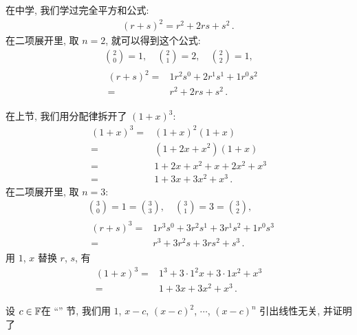 \begin{example}
    在中学, 我们学过完全平方和公式:
    \begin{align*}
        (r + s)^2 = r^2 + 2rs + s^2 \period
    \end{align*}
    在二项展开里, 取 $n = 2$, 就可以得到这个公式:
    \begin{align*}
         & \binom{2}{0} = 1, \quad \binom{2}{1} = 2, \quad \binom{2}{2} = 1, \\
         & \begin{aligned}
            (r + s)^2
            = {} & 1r^2 s^0 + 2r^1 s^1 + 1r^0 s^2 \\
            = {} & r^2 + 2rs + s^2 \period
        \end{aligned}
    \end{align*}

    在上节, 我们用分配律拆开了 $(1+x)^3$:
    \begin{align*}
        (1+x)^3
        = {} & (1+x)^2 (1+x)         \\
        = {} & (1+2x+x^2) (1+x)      \\
        = {} & 1+2x+x^2 + x+2x^2+x^3 \\
        = {} & 1+3x+3x^2+x^3 \period
    \end{align*}
    在二项展开里, 取 $n = 3$:
    \begin{align*}
         & \binom{3}{0} = 1 = \binom{3}{3}, \quad \binom{3}{1} = 3 = \binom{3}{2}, \\
         & \begin{aligned}
            (r+s)^3
            = {} & 1r^3 s^0 + 3r^2 s^1 + 3r^1 s^2 + 1r^0 s^3 \\
            = {} & r^3 + 3r^2 s + 3r s^2 + s^3 \period
        \end{aligned}
    \end{align*}
    用 $1$, $x$ 替换 $r$, $s$, 有
    \begin{align*}
        (1+x)^3
        = {} & 1^3 + 3 \cdot 1^2 x + 3 \cdot 1 x^2 + x^3 \\
        = {} & 1 + 3x + 3x^2 + x^3 \period
    \end{align*}
\end{example}

设 $c \in \mathbb{F}$\period 在 ``\PolynomialEquality '' 节, 我们用 $1$, $x-c$, $(x-c)^2$, $\cdots$, $(x-c)^n$ 引出线性无关, 并证明了


